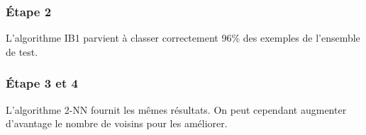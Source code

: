 \documentclass[a4paper,12pt]{article}
\begin{document}
\subsubsection*{\'Etape 2}
L'algorithme IB1 parvient à classer correctement 96\% des exemples de l'ensemble de test.

\subsubsection*{\'Etape 3 et 4}
L'algorithme 2-NN fournit les mêmes résultats. On peut cependant augmenter d'avantage le nombre de voisins pour les améliorer.

\end{document}
